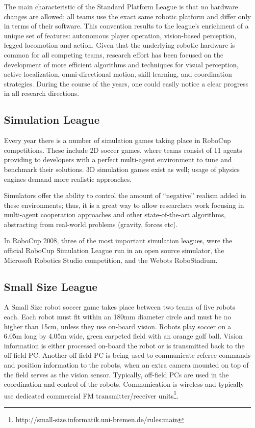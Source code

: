 The main characteristic of the Standard Platform League is that no hardware changes are allowed; all teams use the exact same robotic platform and differ only in terms of their software. This convention results to the league's enrichment of a unique set of features: autonomous player operation, vision-based perception, legged locomotion and action. Given that the underlying robotic hardware is common for all competing teams, research effort has been focused on the development of more efficient algorithms and techniques for visual perception, active localization, omni-directional motion, skill learning, and coordination strategies. During the course of the years, one could easily notice a clear progress in all research directions.

\subsection{Simulation League}

Every year there is a number of simulation games taking place in RoboCup competitions. These include 2D soccer games, where teams consist of 11 agents providing to developers with a perfect multi-agent environment to tune and benchmark their solutions. 3D simulation games exist as well; usage of physics engines demand more realistic approaches.

Simulators offer the ability to control the amount of ``negative'' realism added in these environments; thus, it is a great way to allow researchers work focusing in multi-agent cooperation approaches and other state-of-the-art algorithms, abstracting from real-world problems (gravity, forces etc).

In RoboCup 2008, three of the most important simulation leagues, were the official RoboCup Simulation League run in an open source simulator, the Microsoft Robotics Studio competition, and the Webots RoboStadium.

\subsection{Small Size League}

A Small Size robot soccer game takes place between two teams of five robots each. Each robot must fit within an 180mm diameter circle and must be no higher than 15cm, unless they use on-board vision. Robots play soccer on a 6.05m long by 4.05m wide, green carpeted field with an orange golf ball. Vision information is either processed on-board the robot or is transmitted back to the off-field PC. Another off-field PC is being used to communicate referee commands and position information to the robots, when an extra camera mounted on top of the field serves as the vision sensor. Typically, off-field PCs are used in the coordination and control of the robots. Communication is wireless and typically use dedicated commercial FM transmitter/receiver units\footnote{http://small-size.informatik.uni-bremen.de/rules:main}.

